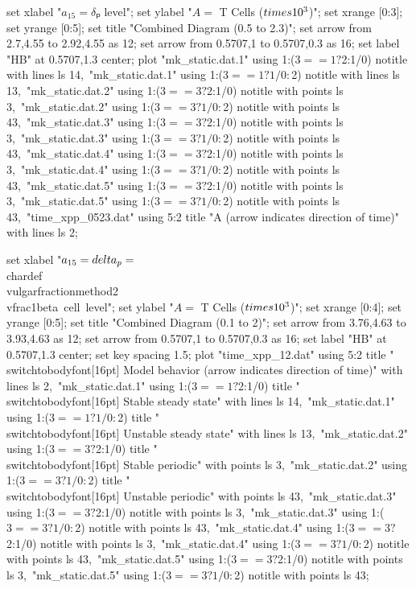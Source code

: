   set xlabel "$a_{15} = δₚ$ level";
  set ylabel "$A = $ T Cells ($\\times 10^3$)";
  set xrange [0:3];
  set yrange [0:5];
  set title "Combined Diagram (0.5 to 2.3)";
  set arrow from 2.7,4.55 to 2.92,4.55 as 12;
  set arrow from 0.5707,1 to 0.5707,0.3 as 16;
  set label "HB" at 0.5707,1.3 center;
  plot "mk_static.dat.1" using 1:($3==1?$2:1/0) notitle with lines ls 14,\
       "mk_static.dat.1" using 1:($3==1?1/0:$2) notitle with lines ls 13,\
       "mk_static.dat.2" using 1:($3==3?$2:1/0) notitle with points ls 3,\
       "mk_static.dat.2" using 1:($3==3?1/0:$2) notitle with points ls 43,\
       "mk_static.dat.3" using 1:($3==3?$2:1/0) notitle with points ls 3,\
       "mk_static.dat.3" using 1:($3==3?1/0:$2) notitle with points ls 43,\
       "mk_static.dat.4" using 1:($3==3?$2:1/0) notitle with points ls 3,\
       "mk_static.dat.4" using 1:($3==3?1/0:$2) notitle with points ls 43,\
       "mk_static.dat.5" using 1:($3==3?$2:1/0) notitle with points ls 3,\
       "mk_static.dat.5" using 1:($3==3?1/0:$2) notitle with points ls 43,\
       "time_xpp_0523.dat" using 5:2 title "A (arrow indicates direction of time)" with lines ls 2;
\stopGNUPLOTscript

\startGNUPLOTscript[bifurcation_combined_12]
  set xlabel "$a_{15} = \\delta_p = $\\chardef\\vulgarfractionmethod2\\vfrac1{beta~cell~level}";
  set ylabel "$A = $ T Cells ($\\times 10^3$)";
  set xrange [0:4];
  set yrange [0:5];
  set title "Combined Diagram (0.1 to 2)";
  set arrow from 3.76,4.63 to 3.93,4.63 as 12;
  set arrow from 0.5707,1 to 0.5707,0.3 as 16;
  set label "HB" at 0.5707,1.3 center;
  set key spacing 1.5;
  plot "time_xpp_12.dat" using 5:2 title "\\switchtobodyfont[16pt] Model behavior (arrow indicates direction of time)" with lines ls 2,\
       "mk_static.dat.1" using 1:($3==1?$2:1/0) title "\\switchtobodyfont[16pt] Stable steady state" with lines ls 14,\
       "mk_static.dat.1" using 1:($3==1?1/0:$2) title "\\switchtobodyfont[16pt] Unstable steady state" with lines ls 13,\
       "mk_static.dat.2" using 1:($3==3?$2:1/0) title "\\switchtobodyfont[16pt] Stable periodic" with points ls 3,\
       "mk_static.dat.2" using 1:($3==3?1/0:$2) title "\\switchtobodyfont[16pt] Unstable periodic" with points ls 43,\
       "mk_static.dat.3" using 1:($3==3?$2:1/0) notitle with points ls 3,\
       "mk_static.dat.3" using 1:($3==3?1/0:$2) notitle with points ls 43,\
       "mk_static.dat.4" using 1:($3==3?$2:1/0) notitle with points ls 3,\
       "mk_static.dat.4" using 1:($3==3?1/0:$2) notitle with points ls 43,\
       "mk_static.dat.5" using 1:($3==3?$2:1/0) notitle with points ls 3,\
       "mk_static.dat.5" using 1:($3==3?1/0:$2) notitle with points ls 43;
\stopGNUPLOTscript

